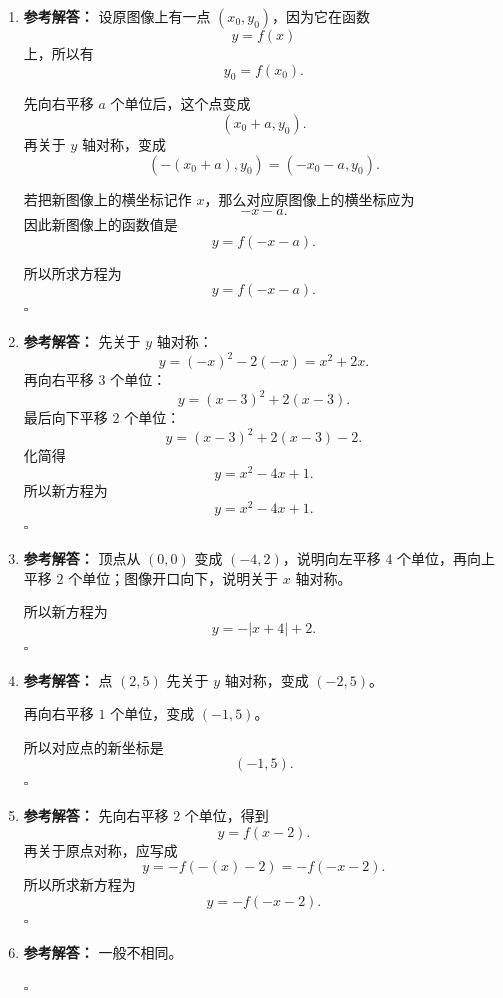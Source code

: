 \documentclass[11pt,a4paper,fontset=fandol]{ctexart}
\newenvironment{solution}{\par\noindent\textbf{参考解答：}}{\hfill$\square$\par}
\begin{document}
\begin{enumerate}
  \item \begin{solution}
  设原图像上有一点 \((x_0,y_0)\)，因为它在函数
  \[
  y=f(x)
  \]
  上，所以有
  \[
  y_0=f(x_0).
  \]

  先向右平移 $a$ 个单位后，这个点变成
  \[
  (x_0+a,y_0).
  \]
  再关于 \(y\) 轴对称，变成
  \[
  (-(x_0+a),y_0)=(-x_0-a,y_0).
  \]

  若把新图像上的横坐标记作 $x$，那么对应原图像上的横坐标应为
  \[
  -x-a.
  \]
  因此新图像上的函数值是
  \[
  y=f(-x-a).
  \]

  所以所求方程为
  \[
  \boxed{y=f(-x-a)}.
  \]
  \end{solution}

  \item \begin{solution}
  先关于 \(y\) 轴对称：
  \[
  y=(-x)^2-2(-x)=x^2+2x.
  \]
  再向右平移 $3$ 个单位：
  \[
  y=(x-3)^2+2(x-3).
  \]
  最后向下平移 $2$ 个单位：
  \[
  y=(x-3)^2+2(x-3)-2.
  \]
  化简得
  \[
  y=x^2-4x+1.
  \]
  所以新方程为
  \[
  \boxed{y=x^2-4x+1}.
  \]
  \end{solution}

  \item \begin{solution}
  顶点从 \((0,0)\) 变成 \((-4,2)\)，说明向左平移 $4$ 个单位，再向上平移 $2$ 个单位；图像开口向下，说明关于 \(x\) 轴对称。

  所以新方程为
  \[
  \boxed{y=-|x+4|+2}.
  \]
  \end{solution}

  \item \begin{solution}
  点 \((2,5)\) 先关于 \(y\) 轴对称，变成 \((-2,5)\)。

  再向右平移 $1$ 个单位，变成 \((-1,5)\)。

  所以对应点的新坐标是
  \[
  \boxed{(-1,5)}.
  \]
  \end{solution}

  \item \begin{solution}
  先向右平移 $2$ 个单位，得到
  \[
  y=f(x-2).
  \]
  再关于原点对称，应写成
  \[
  y=-f(-(x)-2)=-f(-x-2).
  \]
  所以所求新方程为
  \[
  \boxed{y=-f(-x-2)}.
  \]
  \end{solution}

  \item \begin{solution}
  一般不相同。


\end{solution}
\end{enumerate}
\end{document}
